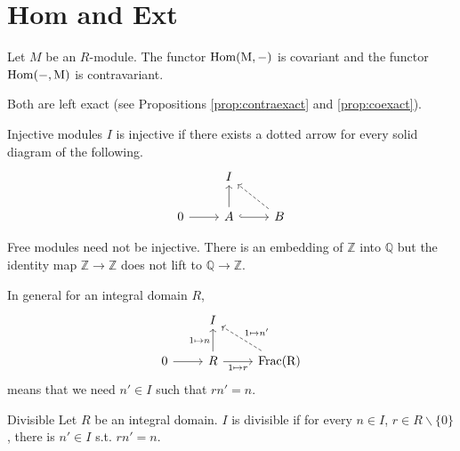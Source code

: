 \section{Hom and Ext}
    Let $M$ be an $R$-module. The functor $\rm{Hom}(M,-)$ is covariant and the functor $\rm{Hom}(-,M)$ is contravariant.

Both are left exact (see Propositions \ref{prop:contraexact} and \ref{prop:coexact}).


\begin{adefinition}{Injective modules}{}
    $I$ is injective if there exists a dotted arrow for every solid diagram of the following.
\[\begin{tikzcd}
	& I \\
	0 & A & B
	\arrow[from=2-1, to=2-2]
	\arrow[from=2-2, to=1-2]
	\arrow[hook, from=2-2, to=2-3]
	\arrow[dashed, from=2-3, to=1-2]
\end{tikzcd}\]

\end{adefinition}
\begin{remark}
    Free modules need not be injective. 
    There is an embedding of $\mathbb{Z}$ into $\mathbb{Q}$ but the identity map $\mathbb{Z}\to \mathbb{Z}$ does not lift to $\mathbb{Q}\to \mathbb{Z}$.

    In general for an integral domain $R$, %
\[\begin{tikzcd}
	& I \\
	0 & R & {\rm{Frac}(R)}
	\arrow[from=2-1, to=2-2]
	\arrow["{1\mapsto n}", from=2-2, to=1-2]
	\arrow["{1\mapsto r}"', from=2-2, to=2-3]
	\arrow["{1\mapsto n'}"', dashed, from=2-3, to=1-2]
\end{tikzcd}\]
means that we need $n'\in I$ such that $rn'=n$.
\end{remark}
\begin{adefinition}{Divisible}{}
    Let $R$ be an integral domain. $I$ is divisible if for every $n\in I$, $r\in R\backslash\{0\}$, there is $n'\in I$ s.t. $rn'=n$.
\end{adefinition}

